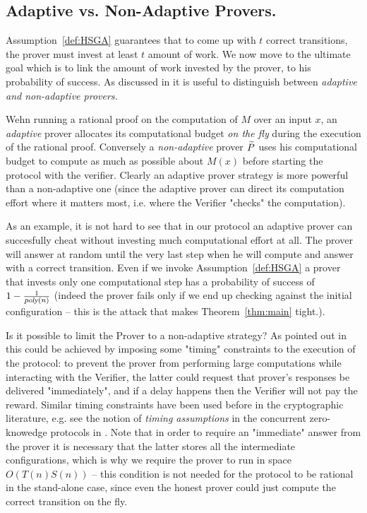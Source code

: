 \subsection{Adaptive vs. Non-Adaptive Provers.}

Assumption~\ref{def:HSGA} guarantees that to come up with $t$ correct transitions, the prover must invest at least $t$ amount of work. We now move to the ultimate goal which is to link the amount of work invested by the prover, to his probability of success. 
As discussed in \cite{cg15} it is useful to distinguish between {\em adaptive and non-adaptive provers.}

Wehn running a rational proof on the computation of $M$ over an input $x$, an {\em adaptive} prover allocates its computational budget  {\em on the fly} during the execution of the rational proof. Conversely a {\em non-adaptive} prover $\widetilde{P}$ uses his computational budget to compute as much as possible about $M(x)$ before starting the protocol with the verifier. Clearly an adaptive prover strategy is more powerful than a non-adaptive one (since the adaptive prover can direct its computation effort where it matters most, i.e. where the Verifier "checks" the computation).

As an example, it is not hard to see that in our protocol an adaptive prover can 
succesfully cheat without investing much computational effort at all. The prover will answer at random until the very last step when he will compute and answer with a correct transition. Even if we invoke Assumption~\ref{def:HSGA} a prover that invests only one computational step has a probability of success of  $1-\frac{1}{{\textsl{poly}}(n)}$ (indeed the prover fails only if we end up checking against the initial configuration -- this is the attack that makes Theorem~\ref{thm:main} tight.). 


Is it possible to limit the Prover to a non-adaptive strategy? As pointed out in \cite{cg15} this could be achieved by imposing some "timing" constraints to the execution of the protocol: to prevent the prover from performing large computations while interacting with the Verifier, the latter could request that prover's responses be delivered "immediately", and if a delay happens then the Verifier will not pay the reward. Similar timing constraints have been used before in the cryptographic literature, e.g. see the notion of {\em timing assumptions} in the concurrent zero-knowedge protocols in \cite{dns}. Note that in order to require an "immediate" answer from the prover it is 
necessary that the latter stores all the intermediate configurations, which is why we require the prover to run in space $O(T(n)S(n))$ -- this condition is not needed for the protocol to be rational in the stand-alone case, since even the honest prover could just compute the correct transition on the fly. 

